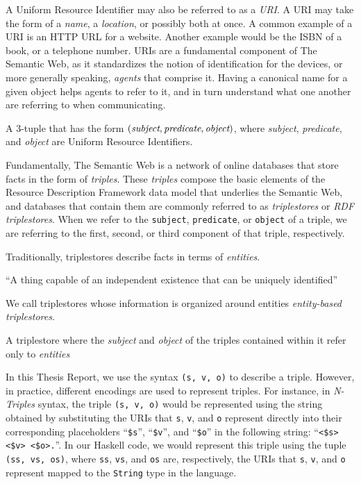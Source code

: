 \documentclass[../main.tex]{subfiles}
\begin{document}
A Uniform Resource Identifier may also be referred to as a {\em URI}.  A URI may take the form of a {\em name}, a {\em location}, or possibly both at once.
A common example of a URI is an HTTP URL for a website.  Another example would be the ISBN of a book, or a telephone number.
URIs are a fundamental component of The Semantic Web, as it standardizes the notion of identification for the devices, or more generally speaking, {\em agents}
that comprise it.  Having a canonical name for a given object helps agents to refer to it, and in turn understand what one another are referring to when communicating.

\begin{definition}[Triple]
	A 3-tuple that has the form $(\text{\em subject}, \text{\em predicate}, \text{\em object})$, where {\em subject}, {\em predicate}, and {\em object} are Uniform Resource Identifiers\cite{w3csemanticweb}.
\end{definition}

Fundamentally, The Semantic Web is a network of online databases that store facts in the form of {\em triples}.
These {\em triples} compose the basic elements of the Resource Description Framework data model that underlies the Semantic Web, and databases that contain them are commonly referred to as {\em triplestores} or {\em RDF triplestores}.  When we refer to the \texttt{subject}, \texttt{predicate}, or \texttt{object} of a triple, we are referring to the first, second, or third component of that triple, respectively.

Traditionally, triplestores describe facts in terms of {\em entities}.

\begin{definition}[Entity]
	``A thing capable of an independent existence that can be uniquely identified''\cite{kent2015era}
\end{definition}

We call triplestores whose information is organized around entities {\em entity-based triplestores}.

\begin{definition}
	A triplestore where the {\em subject} and {\em object} of the triples contained within it refer only to {\em entities}
\end{definition}

In this Thesis Report, we use the syntax \texttt{(s, v, o)} to describe a triple.  However, in practice, different encodings are used
to represent triples.  For instance, in {\em N-Triples} syntax\cite{w3cntriples}, the triple \texttt{(s, v, o)} would be represented using
the string obtained by substituting the URIs that \texttt{s}, \texttt{v}, and \texttt{o} represent directly into their corresponding placeholders ``\texttt{\$s}'', ``\texttt{\$v}'', and ``\texttt{\$o}'' in the following string:  ``\texttt{<\$s> <\$v> <\$o>.}''.  In our Haskell code, we would represent this triple using the tuple \texttt{(ss, vs, os)}, where \texttt{ss}, \texttt{vs}, and \texttt{os} are, respectively, the URIs that \texttt{s}, \texttt{v}, and \texttt{o} represent mapped to the \texttt{String} type in the language.
\end{document}
